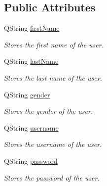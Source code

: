 \subsection*{Public Attributes}
\begin{DoxyCompactItemize}
\item 
\mbox{\label{classaccount_a53f926e7c25a0054b899034a428c05ec}} 
Q\+String \hyperlink{classaccount_a53f926e7c25a0054b899034a428c05ec}{first\+Name}
\begin{DoxyCompactList}\small\item\em Stores the first name of the user. \end{DoxyCompactList}\item 
\mbox{\label{classaccount_ab7b85d1d60c8316ab7713d0b1a17126e}} 
Q\+String \hyperlink{classaccount_ab7b85d1d60c8316ab7713d0b1a17126e}{last\+Name}
\begin{DoxyCompactList}\small\item\em Stores the last name of the user. \end{DoxyCompactList}\item 
\mbox{\label{classaccount_ab50ad16edf35d60dc45339ea81e3a8ab}} 
Q\+String \hyperlink{classaccount_ab50ad16edf35d60dc45339ea81e3a8ab}{gender}
\begin{DoxyCompactList}\small\item\em Stores the gender of the user. \end{DoxyCompactList}\item 
\mbox{\label{classaccount_a69f952587c8f946f8d9d7d1ac0032858}} 
Q\+String \hyperlink{classaccount_a69f952587c8f946f8d9d7d1ac0032858}{username}
\begin{DoxyCompactList}\small\item\em Stores the username of the user. \end{DoxyCompactList}\item 
\mbox{\label{classaccount_a4dfb7739beca4f813f0da9db1d320e74}} 
Q\+String \hyperlink{classaccount_a4dfb7739beca4f813f0da9db1d320e74}{password}
\begin{DoxyCompactList}\small\item\em Stores the password of the user. \end{DoxyCompactList}\item 

\end{DoxyCompactItemize}

